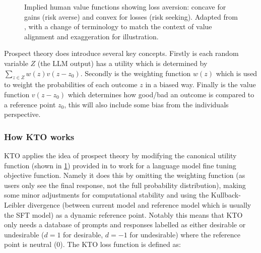 \begin{figure}[h!]
\centering
{}
\caption{Implied human value functions showing loss aversion: concave for gains (risk averse) and convex for losses (risk seeking). Adapted from \cite{tverskyAdvancesProspectTheory1992}, with a change of terminology to match the context of value alignment and exaggeration for illustration.}
\label{fig:prospect_theory}
\end{figure}

Prospect theory does introduce several key concepts. Firstly is each random variable $Z$ (the LLM output) has a utility which is determined by $\sum_{z \in Z} w(z) v(z-z_0)$. Secondly is the weighting function $w(z)$ which is used to weight the probabilities of each outcome $z$ in a biased way. Finally is the value function $v(z-z_0)$ which determines how good/bad an outcome is compared to a reference point $z_0$, this will also include some bias from the individuals perspective.

\subsubsection{How KTO works}

KTO applies the idea of prospect theory by modifying the canonical utility function (shown in \ref{fig:prospect_theory}) provided in \cite{tverskyAdvancesProspectTheory1992} to work for a language model fine tuning objective function. Namely it does this by omitting the weighting function (as users only see the final response, not the full probability distribution), making some minor adjustments for computational stability and using the Kullback-Leibler divergence \cite{kullbackInformationSufficiency1951} (between current model and reference model which is usually the SFT model) as a dynamic reference point. Notably this means that KTO only needs a database of prompts and responses labelled as either desirable or undesirable ($d=1$ for desirable, $d=-1$ for undesirable) where the reference point is neutral ($0$). The KTO loss function is defined as:

